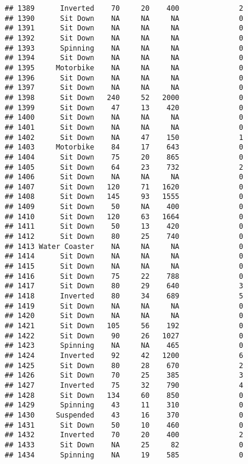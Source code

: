 \documentclass[
]{article}
\begin{document}
\begin{verbatim}
## 1389      Inverted    70     20    400              2
## 1390      Sit Down    NA     NA     NA              0
## 1391      Sit Down    NA     NA     NA              0
## 1392      Sit Down    NA     NA     NA              0
## 1393      Spinning    NA     NA     NA              0
## 1394      Sit Down    NA     NA     NA              0
## 1395     Motorbike    NA     NA     NA              0
## 1396      Sit Down    NA     NA     NA              0
## 1397      Sit Down    NA     NA     NA              0
## 1398      Sit Down   240     52   2000              0
## 1399      Sit Down    47     13    420              0
## 1400      Sit Down    NA     NA     NA              0
## 1401      Sit Down    NA     NA     NA              0
## 1402      Sit Down    NA     47    150              1
## 1403     Motorbike    84     17    643              0
## 1404      Sit Down    75     20    865              0
## 1405      Sit Down    64     23    732              2
## 1406      Sit Down    NA     NA     NA              0
## 1407      Sit Down   120     71   1620              0
## 1408      Sit Down   145     93   1555              0
## 1409      Sit Down    50     NA    400              0
## 1410      Sit Down   120     63   1664              0
## 1411      Sit Down    50     13    420              0
## 1412      Sit Down    80     25    740              0
## 1413 Water Coaster    NA     NA     NA              0
## 1414      Sit Down    NA     NA     NA              0
## 1415      Sit Down    NA     NA     NA              0
## 1416      Sit Down    75     22    788              0
## 1417      Sit Down    80     29    640              3
## 1418      Inverted    80     34    689              5
## 1419      Sit Down    NA     NA     NA              0
## 1420      Sit Down    NA     NA     NA              0
## 1421      Sit Down   105     56    192              0
## 1422      Sit Down    90     26   1027              0
## 1423      Spinning    NA     NA    465              0
## 1424      Inverted    92     42   1200              6
## 1425      Sit Down    80     28    670              2
## 1426      Sit Down    70     25    385              3
## 1427      Inverted    75     32    790              4
## 1428      Sit Down   134     60    850              0
## 1429      Spinning    43     11    310              0
## 1430     Suspended    43     16    370              0
## 1431      Sit Down    50     10    460              0
## 1432      Inverted    70     20    400              2
## 1433      Sit Down    NA     25     82              0
## 1434      Spinning    NA     19    585              0

\end{verbatim}
\end{document}
